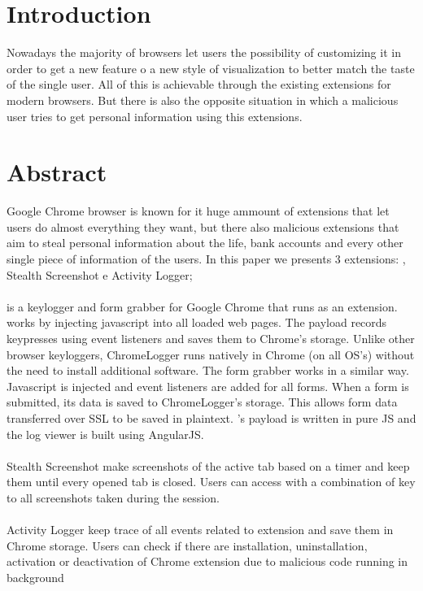 \documentclass[12pt]{article}
\begin{document}
\begin{multicols}{2}
	\section*{Introduction}
	Nowadays the majority of browsers let users the possibility of customizing it in order to get a new feature o a new style of visualization to better match the taste of the single user.
	All of this is achievable through the existing extensions for modern browsers. But there is also the opposite situation in which a malicious user tries to get personal information using this extensions.
	
	\section*{Abstract}
	Google Chrome browser is known for it huge ammount of extensions that let users do almost everything they want, but there also malicious extensions that aim to steal personal information about the life, bank accounts and every other single piece of information of the users. In this paper we presents 3 extensions: \cite{ChromeLogger}, Stealth Screenshot e Activity Logger;\\ \\
	\cite{ChromeLogger} is a keylogger and form grabber for Google Chrome that runs as an extension.	
	\cite{ChromeLogger} works by injecting javascript into all loaded web pages. The payload records keypresses using event listeners and saves them to Chrome's storage. Unlike other browser keyloggers, ChromeLogger runs natively in Chrome (on all OS's) without the need to install additional software.
	The form grabber works in a similar way. Javascript is injected and event listeners are added for all forms. When a form is submitted, its data is saved to ChromeLogger's storage. This allows form data transferred over SSL to be saved in plaintext.
	\cite{ChromeLogger}'s payload is written in pure JS and the log viewer is built using AngularJS.\\ \\
	Stealth Screenshot make screenshots of the active tab based on a timer and keep them until every opened tab is closed. Users can access with a combination of key to all screenshots taken during the session.\\ \\
	Activity Logger keep trace of all events related to extension and save them in Chrome storage. Users can check if there are installation, uninstallation, activation or deactivation of Chrome extension due to malicious code running in background 
\end{multicols}
 
\end{document}
